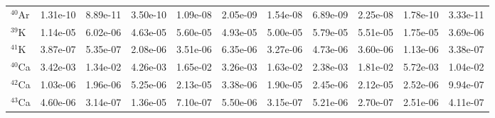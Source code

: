 \begin{landscape}
\begin{table}
\begin{tabular}{l|cc|cc|cc|cc|cc}
$^{40}$Ar & 1.31e-10 & 8.89e-11 & 3.50e-10 & 1.09e-08 & 2.05e-09 & 1.54e-08 & 6.89e-09 & 2.25e-08 & 1.78e-10 & 3.33e-11\\
$^{39}$K & 1.14e-05 & 6.02e-06 & 4.63e-05 & 5.60e-05 & 4.93e-05 & 5.00e-05 & 5.79e-05 & 5.51e-05 & 1.75e-05 & 3.69e-06\\
$^{41}$K & 3.87e-07 & 5.35e-07 & 2.08e-06 & 3.51e-06 & 6.35e-06 & 3.27e-06 & 4.73e-06 & 3.60e-06 & 1.13e-06 & 3.38e-07\\
$^{40}$Ca & 3.42e-03 & 1.34e-02 & 4.26e-03 & 1.65e-02 & 3.26e-03 & 1.63e-02 & 2.38e-03 & 1.81e-02 & 5.72e-03 & 1.04e-02\\
$^{42}$Ca & 1.03e-06 & 1.96e-06 & 5.25e-06 & 2.13e-05 & 3.38e-06 & 1.90e-05 & 2.45e-06 & 2.12e-05 & 2.52e-06 & 9.94e-07\\
$^{43}$Ca & 4.60e-06 & 3.14e-07 & 1.36e-05 & 7.10e-07 & 5.50e-06 & 3.15e-07 & 5.21e-06 & 2.70e-07 & 2.51e-06 & 4.11e-07\\
\hline
\end{tabular}
\end{table}
\end{landscape}


